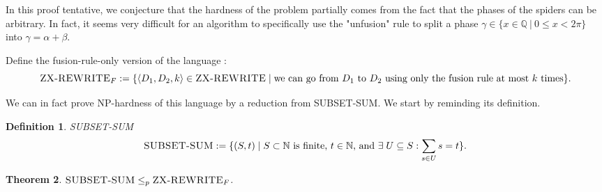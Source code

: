 \documentclass[journal,onecolumn]{IEEEtran}
\newtheorem{theorem}{Theorem}
\newtheorem{definition}[theorem]{Definition}
\begin{document}
In this proof tentative, we conjecture that the hardness of the problem partially comes from the fact that the phases of the spiders can be arbitrary. In fact, it seems very difficult for an algorithm to specifically use the "unfusion" rule to split a phase $\gamma \in \{x \in \mathbb{Q} \: | \: 0 \leq x < 2\pi\}$ into $\gamma = \alpha + \beta$.

Define the fusion-rule-only version of the language :
$$
\textsc{ZX-REWRITE}_F := \{ \left< D_1, D_2, k \right> \in \textsc{ZX-REWRITE}\; | \; \text{we can go from } D_1 \text{ to } D_2 \text{ using only the fusion rule at most } k \text{ times}\}.
$$ 

We can in fact prove \textsc{NP}-hardness of this language by a reduction from \textsc{SUBSET-SUM}. We start by reminding its definition.
\begin{definition}{\textsc{SUBSET-SUM}}{}
	$$
	\textsc{SUBSET-SUM} := \{(S, t) \; | \; S \subset \mathbb{N} \text{ is finite, } t \in \mathbb{N} \text{, and } \exists \; U \subseteq S : \sum_{s \in U} s = t \}.
	$$ 
\end{definition}

\begin{theorem}{}{}
$\textsc{SUBSET-SUM} \leq_p \textsc{ZX-REWRITE}_F$.
\end{theorem}
\end{document}
